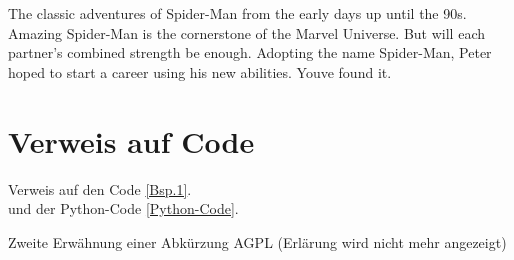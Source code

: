     The classic adventures of Spider-Man from the early days up until the 90s. Amazing Spider-Man is the cornerstone of the Marvel Universe. But will each partner’s combined strength be enough. Adopting the name Spider-Man, Peter hoped to start a career using his new abilities. Youve found it.
    
    \section{Verweis auf Code}
    Verweis auf den Code \autoref{Bsp.1}.\\
    und der Python-Code \autoref{Python-Code}.
    
    Zweite Erwähnung einer Abkürzung \ac{AGPL} (Erlärung wird nicht mehr angezeigt)

